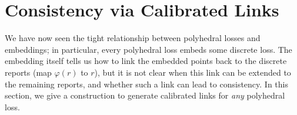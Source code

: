 \documentclass[12pt]{article}
\newcommand{\Comments}{1}
\newcommand{\mynote}[2]{\ifnum\Comments=1\textcolor{#1}{#2}\fi}
\newcommand{\mytodo}[2]{\ifnum\Comments=1%
  \todo[linecolor=#1!80!black,backgroundcolor=#1,bordercolor=#1!80!black]{#2}\fi}
\newcommand{\raf}[1]{\mynote{green}{[RF: #1]}}
\newcommand{\btw}[1]{}%
\newtheorem{corollary}{Corollary}
\begin{document}
\btw{Cut summary for now (Why is this cool?)}



\section{Consistency via Calibrated Links}
\label{sec:calibration}

We have now seen the tight relationship between polyhedral losses and embeddings; in particular, every polyhedral loss embeds some discrete loss.
The embedding itself tells us how to link the embedded points back to the discrete reports (map $\varphi(r)$ to $r$), but it is not clear when this link can be extended to the remaining reports, and whether such a link can lead to consistency.
In this section, we give a construction to generate calibrated links for \emph{any} polyhedral loss.
\end{document}
